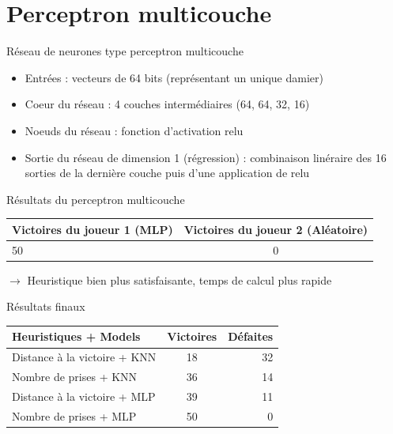\documentclass{beamer}
\begin{document}
{\section{Perceptron multicouche}}

\begin{frame}{Réseau de neurones type perceptron multicouche}
    \begin{itemize}
        \item Entrées : vecteurs de 64 bits (représentant un unique damier)
        \item Coeur du réseau : 4 couches intermédiaires (64, 64, 32, 16)
        \item Noeuds du réseau : fonction d'activation \alert{relu}
        \item Sortie du réseau de dimension 1 (régression) : combinaison linéraire des 16 sorties de la dernière couche puis d'une application de \alert{relu}
    \end{itemize}
\end{frame}

\begin{frame} {Résultats du perceptron multicouche}
    \begin{center}
        \begin{tabular}{ | l | c | }
            \hline
            Victoires du joueur 1 (MLP) & Victoires du joueur 2 (Aléatoire) \\ \hline
            50                          & 0                                 \\ \hline
        \end{tabular}
    \end{center}
    $\rightarrow$ Heuristique bien plus satisfaisante, temps de calcul plus rapide
\end{frame}

\begin{frame}{Résultats finaux}
    \begin{center}
        \begin{tabular}{ | l || c | r |}
            \hline 
            Heuristiques + Models & Victoires & Défaites \\
            \hline 
            \hline 
            Distance à la victoire + KNN & 18 & 32 \\
            Nombre de prises + KNN & 36 & 14 \\
            Distance à la victoire + MLP & 39 & 11 \\
            Nombre de prises + MLP & 50 & 0 \\ \hline
        \end{tabular}

    \end{center}
\end{frame}
\end{document}

